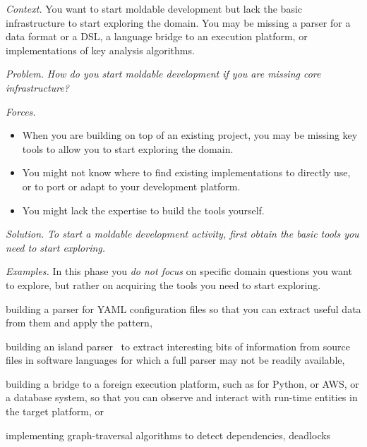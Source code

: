 \documentclass[acmsmall,screen,authorversion,nonacm]{acmart} %
\newcommand\cp[1]{\nbe{Cesare}{#1}{olive}} %
\newcommand\dd[1]{\nbe{Daniel}{#1}{magenta}} %
\newcommand{\patref}[1]{\emph{\nameref{pat:#1}}\xspace}
\newcommand{\patsec}[1]{\noindent\textit{#1.}\xspace}
\begin{document}
\patsec{Context}
You want to start moldable development but lack the basic infrastructure 
to start exploring the domain.
You may be missing a parser for a data format or a DSL, a language bridge to an execution platform, or implementations of key analysis algorithms. 

\patsec{Problem}
\emph{How do you start moldable development if you are missing core infrastructure?}

\patsec{Forces}
\begin{itemize}[---]
\item When you are building on top of an existing project, you may be missing key tools to allow you to start exploring the domain.
\item You might not know where to find existing implementations to directly use, or to port or adapt to your development platform.
\item You might lack the expertise to build the tools yourself.
\end{itemize}

\patsec{Solution}
\emph{To start a moldable development activity, first obtain the basic tools you need to start exploring.}

\patsec{Examples}
In this phase you \emph{do not focus} on specific domain questions you want to explore, but rather on acquiring the tools you need to start exploring.
\begin{inparaenum}[(i)]
\item building a parser for YAML configuration files so that you can extract useful data from them and apply the \patref{MoldableDataWrapper} pattern,
\item building an island parser~\cite{Kurs14b} to extract interesting bits of information from source files 
in software languages for which a full parser may not be readily available,
\item building a bridge to a foreign execution platform, such as for Python, or AWS, or a database system, so that you can observe and interact with run-time entities in the target platform, or
\item implementing graph-traversal algorithms to detect dependencies, deadlocks \etc
\end{inparaenum}
\end{document}
